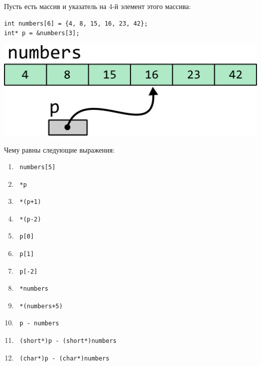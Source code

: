 \documentclass[10pt]{article}
\begin{document}
Пусть есть массив и указатель на 4-й элемент этого массива:
\begin{lstlisting}
int numbers[6] = {4, 8, 15, 16, 23, 42};
int* p = &numbers[3];
\end{lstlisting}

\begin{center}
\includegraphics[scale=0.7]{../images/pointer_task_arithmetics.png}
\end{center}

Чему равны следующие выражения:
\begin{multicols}{3}
\begin{enumerate}
\item \begin{verbatim} numbers[5] \end{verbatim}
\item \begin{verbatim} *p \end{verbatim}
\item \begin{verbatim} *(p+1) \end{verbatim}
\item \begin{verbatim} *(p-2) \end{verbatim}
\item \begin{verbatim} p[0] \end{verbatim}
\item \begin{verbatim} p[1] \end{verbatim}
\item \begin{verbatim} p[-2] \end{verbatim}
\item \begin{verbatim} *numbers \end{verbatim}
\item \begin{verbatim} *(numbers+5) \end{verbatim}
\item \begin{verbatim} p - numbers \end{verbatim}
\item \begin{verbatim} (short*)p - (short*)numbers \end{verbatim}
\item \begin{verbatim} (char*)p - (char*)numbers \end{verbatim}
\end{enumerate}
\end{multicols}
\end{document}
